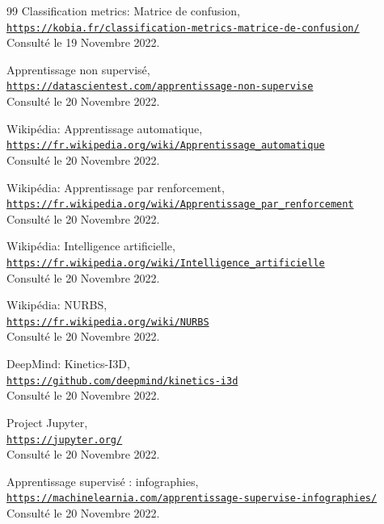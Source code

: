 \begin{thebibliography}{99}
Classification metrics: Matrice de confusion,
\\\texttt{\href{https://kobia.fr/classification-metrics-matrice-de-confusion/}{https://kobia.fr/classification-metrics-matrice-de-confusion/}}
\\ Consulté le 19 Novembre 2022.

Apprentissage non supervisé,
\\\texttt{\href{https://datascientest.com/apprentissage-non-supervise}{https://datascientest.com/apprentissage-non-supervise}}
\\ Consulté le 20 Novembre 2022.

Wikipédia: Apprentissage automatique,
\\\texttt{\href{https://fr.wikipedia.org/wiki/Apprentissage_automatique}{https://fr.wikipedia.org/wiki/Apprentissage\_automatique}}
\\ Consulté le 20 Novembre 2022.

Wikipédia: Apprentissage par renforcement,
\\\texttt{\href{https://fr.wikipedia.org/wiki/Apprentissage_par_renforcement}{https://fr.wikipedia.org/wiki/Apprentissage\_par\_renforcement}}
\\ Consulté le 20 Novembre 2022.

Wikipédia: Intelligence artificielle,
\\\texttt{\href{https://fr.wikipedia.org/wiki/Intelligence_artificielle}{https://fr.wikipedia.org/wiki/Intelligence\_artificielle}}
\\ Consulté le 20 Novembre 2022.

Wikipédia: NURBS,
\\\texttt{\href{https://fr.wikipedia.org/wiki/NURBS}{https://fr.wikipedia.org/wiki/NURBS}}
\\ Consulté le 20 Novembre 2022.

DeepMind: Kinetics-I3D,
\\\texttt{\href{https://github.com/deepmind/kinetics-i3d}{https://github.com/deepmind/kinetics-i3d}}
\\ Consulté le 20 Novembre 2022.

Project Jupyter,
\\\texttt{\href{https://jupyter.org/}{https://jupyter.org/}}
\\ Consulté le 20 Novembre 2022.

Apprentissage supervisé : infographies,
\\\texttt{\href{https://machinelearnia.com/apprentissage-supervise-infographies/}{https://machinelearnia.com/apprentissage-supervise-infographies/}}
\\ Consulté le 20 Novembre 2022.

\end{thebibliography}
